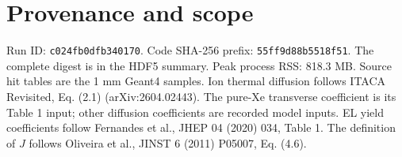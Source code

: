 \documentclass[11pt]{article}
\begin{document}
\section*{Provenance and scope}
Run ID: \texttt{c024fb0dfb340170}. Code SHA-256 prefix: \texttt{55ff9d88b5518f51}. The complete digest is in the HDF5 summary.
Peak process RSS: 818.3 MB. Source hit tables are the 1 mm Geant4 samples.
Ion thermal diffusion follows ITACA Revisited, Eq. (2.1) (arXiv:2604.02443). The pure-Xe transverse coefficient is its Table 1 input; other diffusion coefficients are recorded model inputs. EL yield coefficients follow Fernandes et al., JHEP 04 (2020) 034, Table 1. The definition of $J$ follows Oliveira et al., JINST 6 (2011) P05007, Eq. (4.6).
\end{document}
